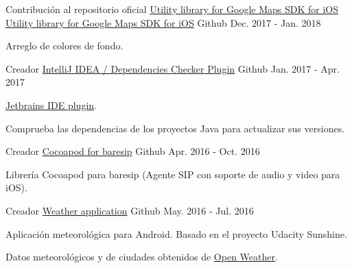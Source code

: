 \begin{cventries}
  \cventry
    {Contribución al repositorio oficial \href{https://github.com/googlemaps/google-maps-ios-utils}{Utility library for Google Maps SDK for iOS}} %
    {\faMapMarker \hphantom{-} \href{https://github.com/miche-atucha/google-maps-ios-utils}{Utility library for Google Maps SDK for iOS}} %
    {\faGithubSquare\acvHeaderIconSep Github} %
    {Dec. 2017 - Jan. 2018} %
    {
      \begin{cvitems} %
        \item {Arreglo de colores de fondo.}
      \end{cvitems}
    }

  \cventry
    {Creador} %
    {\href{https://github.com/miche-atucha/deps-checker}{IntelliJ IDEA / Dependencies Checker Plugin}} %
    {\faGithubSquare\acvHeaderIconSep Github} %
    {Jan. 2017 - Apr. 2017} %
    {
      \begin{cvitems} %
        \item {\href{https://plugins.jetbrains.com/plugin/9481-java-dependencies-checker}{Jetbrains IDE plugin}.}
        \item {Comprueba las dependencias de los proyectos Java para actualizar sus versiones.}
      \end{cvitems}
    }

  \cventry
    {Creador} %
    {\faMobile \hphantom{-} \href{https://github.com/miche-atucha/taresip}{Cocoapod for baresip}} %
    {\faGithubSquare\acvHeaderIconSep Github} %
    {Apr. 2016 - Oct. 2016} %
    {
      \begin{cvitems} %
        \item {Librería Cocoapod para baresip (Agente SIP con soporte de audio y video para iOS).}
      \end{cvitems}
    }

  \cventry
    {Creador} %
    {\faAndroid \hphantom{-} \href{https://github.com/miche-atucha/weatherer}{Weather application}} %
    {\faGithubSquare\acvHeaderIconSep Github} %
    {May. 2016 - Jul. 2016} %
    {
      \begin{cvitems} %
        \item {Aplicación meteorológica para Android. Basado en el proyecto Udacity Sunshine.}
        \item {Datos meteorológicos y de ciudades obtenidos de \href{https://openweathermap.org/}{Open Weather}.}
      \end{cvitems}
    }


\end{cventries}
